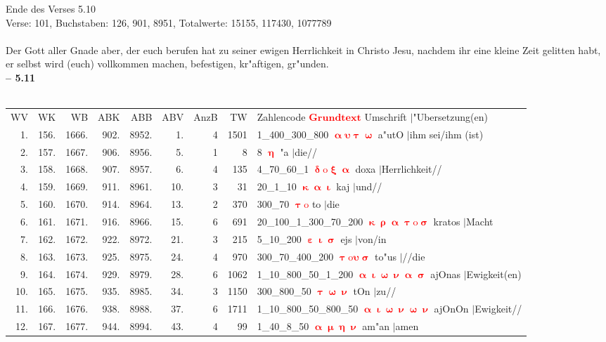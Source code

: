 \documentclass[a4paper,10pt,landscape]{article}
\begin{document}
Ende des Verses 5.10\\
Verse: 101, Buchstaben: 126, 901, 8951, Totalwerte: 15155, 117430, 1077789\\
\\
Der Gott aller Gnade aber, der euch berufen hat zu seiner ewigen Herrlichkeit in Christo Jesu, nachdem ihr eine kleine Zeit gelitten habt, er selbst wird (euch) vollkommen machen, befestigen, kr"aftigen, gr"unden.\\
\newpage 
{\bf -- 5.11}\\
\medskip \\
\begin{tabular}{rrrrrrrrp{120mm}}
WV&WK&WB&ABK&ABB&ABV&AnzB&TW&Zahlencode \textcolor{red}{$\boldsymbol{Grundtext}$} Umschrift $|$"Ubersetzung(en)\\
1.&156.&1666.&902.&8952.&1.&4&1501&1\_400\_300\_800 \textcolor{red}{$\boldsymbol{\upalpha\upsilon\uptau\upomega}$} a"utO $|$ihm sei/ihm (ist)\\
2.&157.&1667.&906.&8956.&5.&1&8&8 \textcolor{red}{$\boldsymbol{\upeta}$} "a $|$die//\\
3.&158.&1668.&907.&8957.&6.&4&135&4\_70\_60\_1 \textcolor{red}{$\boldsymbol{\updelta\mathrm{o}\upxi\upalpha}$} doxa $|$Herrlichkeit//\\
4.&159.&1669.&911.&8961.&10.&3&31&20\_1\_10 \textcolor{red}{$\boldsymbol{\upkappa\upalpha\upiota}$} kaj $|$und//\\
5.&160.&1670.&914.&8964.&13.&2&370&300\_70 \textcolor{red}{$\boldsymbol{\uptau\mathrm{o}}$} to $|$die\\
6.&161.&1671.&916.&8966.&15.&6&691&20\_100\_1\_300\_70\_200 \textcolor{red}{$\boldsymbol{\upkappa\uprho\upalpha\uptau\mathrm{o}\upsigma}$} kratos $|$Macht\\
7.&162.&1672.&922.&8972.&21.&3&215&5\_10\_200 \textcolor{red}{$\boldsymbol{\upepsilon\upiota\upsigma}$} ejs $|$von/in\\
8.&163.&1673.&925.&8975.&24.&4&970&300\_70\_400\_200 \textcolor{red}{$\boldsymbol{\uptau\mathrm{o}\upsilon\upsigma}$} to"us $|$//die\\
9.&164.&1674.&929.&8979.&28.&6&1062&1\_10\_800\_50\_1\_200 \textcolor{red}{$\boldsymbol{\upalpha\upiota\upomega\upnu\upalpha\upsigma}$} ajOnas $|$Ewigkeit(en)\\
10.&165.&1675.&935.&8985.&34.&3&1150&300\_800\_50 \textcolor{red}{$\boldsymbol{\uptau\upomega\upnu}$} tOn $|$zu//\\
11.&166.&1676.&938.&8988.&37.&6&1711&1\_10\_800\_50\_800\_50 \textcolor{red}{$\boldsymbol{\upalpha\upiota\upomega\upnu\upomega\upnu}$} ajOnOn $|$Ewigkeit//\\
12.&167.&1677.&944.&8994.&43.&4&99&1\_40\_8\_50 \textcolor{red}{$\boldsymbol{\upalpha\upmu\upeta\upnu}$} am"an $|$amen\\
\end{tabular}\medskip \\
\end{document}
